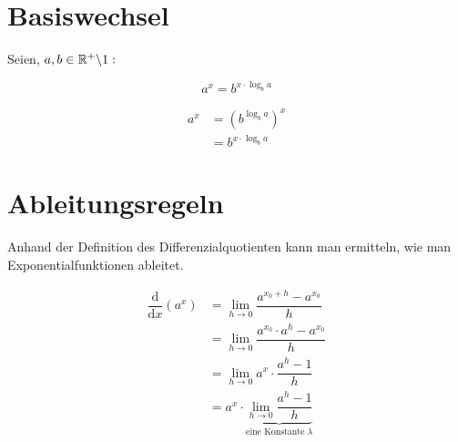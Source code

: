 \documentclass[main.tex]{subfiles}
\begin{document}
		\section{Basiswechsel}

Seien, $a,b\in\mathbb{R}^+\backslash1:$
\begin{Theorem}
$$a^x=b^{ x\cdot\log_b a}$$
\end{Theorem}
\begin{Beweis}
\begin{align*}
a^x&=(b^{\log_b a})^x\\
&=b^{x\cdot\log_b a }
\end{align*}
\end{Beweis}

		\section{Ableitungsregeln}

Anhand der Definition des Differenzialquotienten kann man ermitteln, wie man Exponentialfunktionen ableitet.

\begin{Beweis}
\begin{align*}
\dfrac{\text{d}}{\text{d}x}(a^x) &=\lim\limits_{h\to0}\dfrac{a^{{x_0}+h}-a^{x_0}}{h}\\
&=\lim\limits_{h\to0}\dfrac{a^{x_0}\cdot a^h-a^{x_0}}{h}\\
&=\lim\limits_{h\to0}a^x\cdot\dfrac{a^h-1}{h}\\
&=a^x\cdot\underbrace{\lim\limits_{h\to0}\dfrac{a^h-1}{h}}_{\text{eine Konstante }\lambda}
\end{align*}
\end{Beweis}
\end{document}
